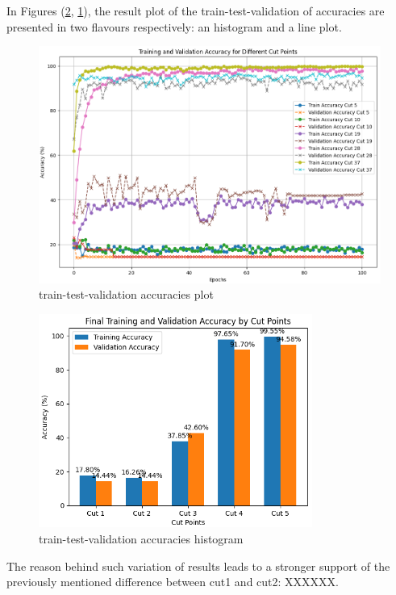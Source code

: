 \documentclass[11pt]{scrartcl}
\begin{document}
In Figures (\ref{fig:task3-bonus-histogram}, \ref{fig:task3-bonus-plot}), 
the result plot of the train-test-validation of accuracies are presented 
in two flavours respectively:
an histogram and a line plot.

\begin{figure}[htbp]
	\centering
	\includegraphics[width=\textwidth]{task3-bonus-plot.png}
	\caption{train-test-validation accuracies plot}
	\label{fig:task3-bonus-plot}
\end{figure}

\begin{figure}[htbp]
	\centering
	\includegraphics[width=0.8\textwidth]{task3-bonus-histogram.png}
	\caption{train-test-validation accuracies histogram}
	\label{fig:task3-bonus-histogram}
\end{figure}

The reason behind such variation of results leads to a stronger 
support of the previously mentioned difference between cut1 and cut2:
XXXXXX.
\end{document}
